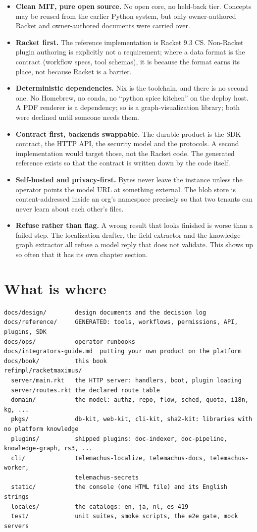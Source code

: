 \documentclass[11pt,a4paper]{report}
\begin{document}
\begin{itemize}
\item \textbf{Clean MIT, pure open source.} No open core, no held-back tier. Concepts may be reused from the earlier Python system, but only owner-authored Racket and owner-authored documents were carried over.
\item \textbf{Racket first.} The reference implementation is Racket 9.3 CS. Non-Racket plugin authoring is explicitly not a requirement; where a data format is the contract (workflow specs, tool schemas), it is because the format earns its place, not because Racket is a barrier.
\item \textbf{Deterministic dependencies.} Nix is the toolchain, and there is no second one. No Homebrew, no conda, no ``python spice kitchen'' on the deploy host. A PDF renderer is a dependency; so is a graph-visualization library; both were declined until someone needs them.
\item \textbf{Contract first, backends swappable.} The durable product is the SDK contract, the HTTP API, the security model and the protocols. A second implementation would target those, not the Racket code. The generated reference exists so that the contract is written down by the code itself.
\item \textbf{Self-hosted and privacy-first.} Bytes never leave the instance unless the operator points the model URL at something external. The blob store is content-addressed inside an org's namespace precisely so that two tenants can never learn about each other's files.
\item \textbf{Refuse rather than flag.} A wrong result that looks finished is worse than a failed step. The localization drafter, the field extractor and the knowledge-graph extractor all refuse a model reply that does not validate. This shows up so often that it has its own chapter section.
\end{itemize}

\section{What is where}

\begin{lstlisting}
docs/design/        design documents and the decision log
docs/reference/     GENERATED: tools, workflows, permissions, API, plugins, SDK
docs/ops/           operator runbooks
docs/integrators-guide.md  putting your own product on the platform
docs/book/          this book
refimpl/racketmaximus/
  server/main.rkt   the HTTP server: handlers, boot, plugin loading
  server/routes.rkt the declared route table
  domain/           the model: authz, repo, flow, sched, quota, i18n, kg, ...
  pkgs/             db-kit, web-kit, cli-kit, sha2-kit: libraries with no platform knowledge
  plugins/          shipped plugins: doc-indexer, doc-pipeline, knowledge-graph, rs3, ...
  cli/              telemachus-localize, telemachus-docs, telemachus-worker,
                    telemachus-secrets
  static/           the console (one HTML file) and its English strings
  locales/          the catalogs: en, ja, nl, es-419
  test/             unit suites, smoke scripts, the e2e gate, mock servers
\end{lstlisting}
\end{document}
